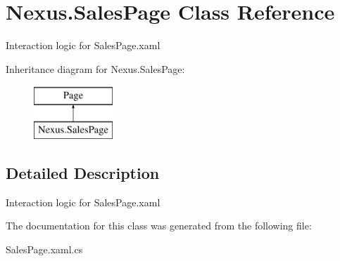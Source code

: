 \hypertarget{class_nexus_1_1_sales_page}{}\section{Nexus.\+Sales\+Page Class Reference}
\label{class_nexus_1_1_sales_page}


Interaction logic for Sales\+Page.\+xaml  


Inheritance diagram for Nexus.\+Sales\+Page\+:\begin{figure}[H]
\begin{center}
\leavevmode
\includegraphics[height=2.000000cm]{class_nexus_1_1_sales_page}
\end{center}
\end{figure}


\subsection{Detailed Description}
Interaction logic for Sales\+Page.\+xaml 



The documentation for this class was generated from the following file\+:\begin{DoxyCompactItemize}
\item 
Sales\+Page.\+xaml.\+cs\end{DoxyCompactItemize}
